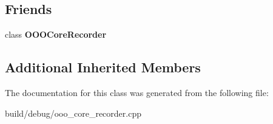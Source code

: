 \subsection*{Friends}
\begin{DoxyCompactItemize}
\item 
\hypertarget{classOOOIssueEvent_ab288e24cc9cca52ebb627d4c18aaa2fa}{class {\bfseries O\-O\-O\-Core\-Recorder}}\label{classOOOIssueEvent_ab288e24cc9cca52ebb627d4c18aaa2fa}

\end{DoxyCompactItemize}
\subsection*{Additional Inherited Members}


The documentation for this class was generated from the following file\-:\begin{DoxyCompactItemize}
\item 
build/debug/ooo\-\_\-core\-\_\-recorder.\-cpp\end{DoxyCompactItemize}

